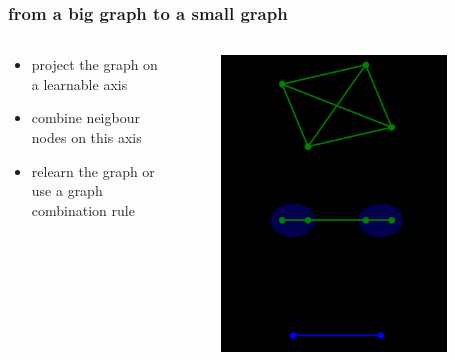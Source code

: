 \documentclass[hyperref={pdfpagelabels=false}]{beamer}
\begin{document}
\begin{frame}[label=from a big graph to a small graph]
\frametitle{from a big graph to a small graph}
\begin{columns}[c] %
\begin{column}{0.48\textwidth}%
\begin{itemize}

    \item project the graph on a learnable axis

    \item combine neigbour nodes on this axis

    \item relearn the graph or use a graph combination rule


\end{itemize}
\end{column}%
\hfill%
\begin{column}{0.48\textwidth}%
\begin{figure}[H] 
  \centering
\includegraphics[width=0.9\textwidth]{../imgs/abiaa}
\label{fig:abiaa}
  \end{figure}


\end{column}%
\hfill%
\end{columns}

\end{frame}
\end{document}
